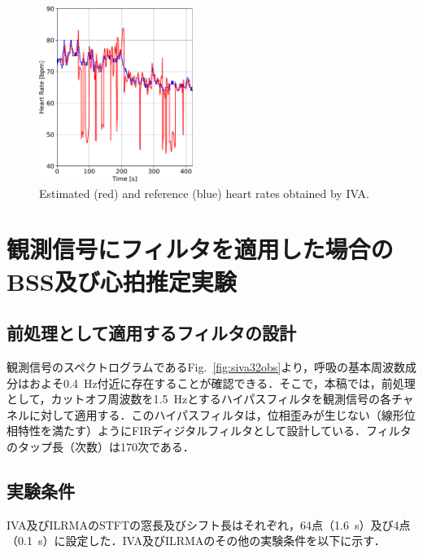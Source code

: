 \documentclass[10.5pt]{jarticle}
\begin{document}
{%
\begin{figure}[tb]
\centering
\vspace{5pt} %
\includegraphics[keepaspectratio, width=50mm]{hr_iva_64_ch3.pdf}
\vspace{-10pt} %
\caption{Estimated (red) and reference (blue) heart rates obtained by IVA.}
\vspace{-15pt} %
\label{fig:hriva64ch3}
\end{figure}

\section{観測信号にフィルタを適用した場合のBSS及び心拍推定実験}
\subsection{前処理として適用するフィルタの設計}
\hspace{1.0em}観測信号のスペクトログラムであるFig.~\ref{fig:siva32obs}より，呼吸の基本周波数成分はおよそ0.4~Hz付近に存在することが確認できる．そこで，本稿では，前処理として，カットオフ周波数を1.5~Hzとするハイパスフィルタを観測信号の各チャネルに対して適用する．このハイパスフィルタは，位相歪みが生じない（線形位相特性を満たす）ようにFIRディジタルフィルタとして設計している．フィルタのタップ長（次数）は170次である．

\subsection{実験条件}
\hspace{1.0em}IVA及びILRMAのSTFTの窓長及びシフト長はそれぞれ，64点（1.6~s）及び4点（0.1~s）に設定した．IVA及びILRMAのその他の実験条件を以下に示す．

}
\end{document}
